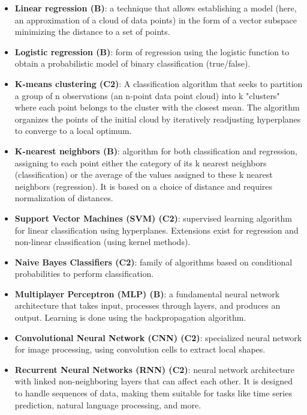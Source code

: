\documentclass{article}
\begin{document}
\begin{itemize}    
    \item \textbf{Linear regression (B)}: a technique that allows establishing a model (here, an approximation of a cloud of data points) in the form of a vector subspace minimizing the distance to a set of points.
    
    \item \textbf{Logistic regression (B)}: form of regression using the logistic function to obtain a probabilistic model of binary classification (true/false).
    
    \item \textbf{K-means clustering (C2)}: A classification algorithm that seeks to partition a group of n observations (an n-point data point cloud) into k "clusters" where each point belongs to the cluster with the closest mean. The algorithm organizes the points of the initial cloud by iteratively readjusting hyperplanes to converge to a local optimum.
    
    \item \textbf{K-nearest neighbors (B)}: algorithm for both classification and regression, assigning to each point either the category of its k nearest neighbors (classification) or the average of the values assigned to these k nearest neighbors (regression). It is based on a choice of distance and requires normalization of distances.
    
    \item \textbf{Support Vector Machines (SVM) (C2)}: supervised learning algorithm for linear classification using hyperplanes. Extensions exist for regression and non-linear classification (using kernel methods).
    
    \item \textbf{Naive Bayes Classifiers (C2)}: family of algorithms based on conditional probabilities to perform classification.
    
    \item \textbf{Multiplayer Perceptron (MLP) (B)}: a fundamental neural network architecture that takes input, processes through layers, and produces an output. Learning is done using the backpropagation algorithm.
    
    \item \textbf{Convolutional Neural Network (CNN) (C2)}: specialized neural network for image processing, using convolution cells to extract local shapes.
    
    \item \textbf{Recurrent Neural Networks (RNN) (C2)}: neural network architecture with linked non-neighboring layers that can affect each other. It is designed to handle sequences of data, making them suitable for tasks like time series prediction, natural language processing, and more.
    

\end{itemize}
\end{document}
